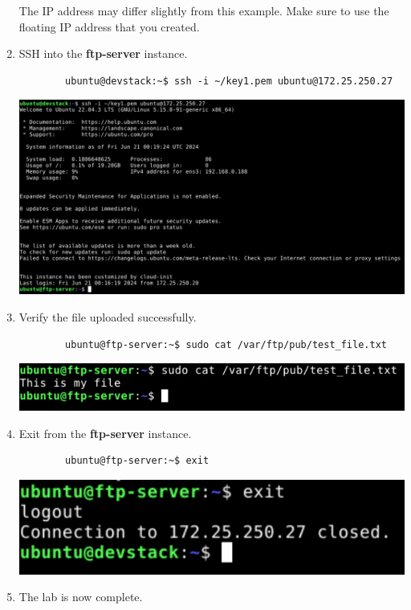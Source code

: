 \documentclass[letterpaper, 12pt]{article}
\begin{document}
\begin{enumerate}
    \begin{notebox}
        The IP address may differ slightly from this example. Make sure to use the floating IP address that you created.
    \end{notebox}

    \item SSH into the \textbf{ftp-server} instance.
    \begin{lstlisting}
        ubuntu@devstack:~$ ssh -i ~/key1.pem ubuntu@172.25.250.27
    \end{lstlisting}

    \begin{center}
        \includegraphics[width=\linewidth]{images/part2/step20.png}
    \end{center}

    \item Verify the file uploaded successfully.
    \begin{lstlisting}
        ubuntu@ftp-server:~$ sudo cat /var/ftp/pub/test_file.txt
    \end{lstlisting}

    \begin{center}
        \includegraphics[width=\linewidth]{images/part2/step21.png}
    \end{center}

    \item Exit from the \textbf{ftp-server} instance.
    \begin{lstlisting}
        ubuntu@ftp-server:~$ exit
    \end{lstlisting}

    \begin{center}
        \includegraphics[width=\linewidth]{images/part2/step22.png}
    \end{center}

    \item The lab is now complete.

\end{enumerate}
\end{document}
